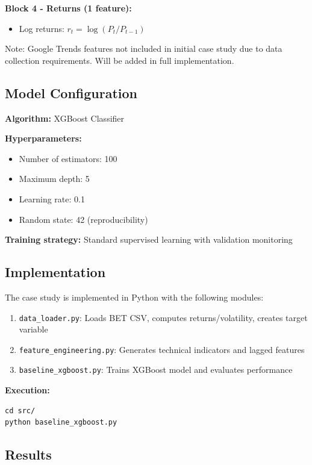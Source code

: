 \documentclass[12pt,a4paper]{article}
\begin{document}
\textbf{Block 4 - Returns (1 feature):}
\begin{itemize}
    \item Log returns: $r_t = \log(P_t / P_{t-1})$
\end{itemize}

Note: Google Trends features not included in initial case study due to data collection requirements. Will be added in full implementation.

\subsection{Model Configuration}

\textbf{Algorithm:} XGBoost Classifier

\textbf{Hyperparameters:}
\begin{itemize}
    \item Number of estimators: 100
    \item Maximum depth: 5
    \item Learning rate: 0.1
    \item Random state: 42 (reproducibility)
\end{itemize}

\textbf{Training strategy:} Standard supervised learning with validation monitoring

\subsection{Implementation}

The case study is implemented in Python with the following modules:

\begin{enumerate}
    \item \texttt{data\_loader.py}: Loads BET CSV, computes returns/volatility, creates target variable
    \item \texttt{feature\_engineering.py}: Generates technical indicators and lagged features
    \item \texttt{baseline\_xgboost.py}: Trains XGBoost model and evaluates performance
\end{enumerate}

\textbf{Execution:}
\begin{verbatim}
cd src/
python baseline_xgboost.py
\end{verbatim}

\subsection{Results}
\end{document}
